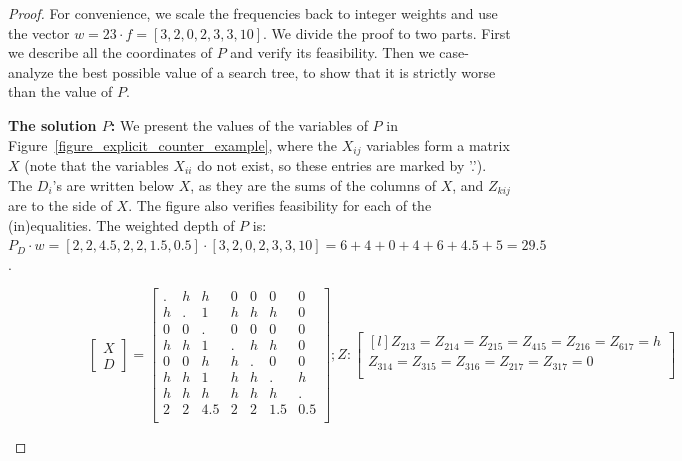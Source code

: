 \begin{proof}
For convenience, we scale the frequencies back to integer weights and use the vector $w = 23 \cdot f = [3,2,0,2,3,3,10]$.
We divide the proof to two parts. First we describe all the coordinates of $P$ and verify its feasibility. Then we case-analyze the best possible value of a search tree, to show that it is strictly worse than the value of $P$.

\textbf{The solution $P$:} We present the values of the variables of $P$ in Figure~\ref{figure_explicit_counter_example}, where the $X_{ij}$ variables form a matrix $X$ (note that the variables $X_{ii}$ do not exist, so these entries are marked by '.'). The $D_i$'s are written below $X$, as they are the sums of the columns of $X$, and $Z_{kij}$ are to the side of $X$. The figure also verifies feasibility for each of the (in)equalities. The weighted depth of $P$ is: $P_D \cdot w = [2,2,4.5,2,2,1.5,0.5] \cdot [3,2,0,2,3,3,10] = 6+4+0+4+6+4.5+5=29.5$.


\begin{figure}[ht]
    {\footnotesize
    \begin{subfigure}{0.9\textwidth}
        \begin{equation}
        \label{equation_vertex_opt_values}
        \begin{bmatrix}
            X \\
            \hline
            D
            \end{bmatrix}
        =
            \begin{bmatrix}
            . & h & h & 0 & 0 & 0 & 0 \\
            h & . & 1 & h & h & h & 0 \\
            0 & 0 & . & 0 & 0 & 0 & 0 \\
            h & h & 1 & . & h & h & 0 \\
            0 & 0 & h & h & . & 0 & 0 \\
            h & h & 1 & h & h & . & h \\
            h & h & h & h & h & h & . \\
            \hline
            2 & 2 & 4.5 & 2 & 2 & 1.5 & 0.5 \\
            \end{bmatrix}
        ; Z:
        \begin{bmatrix*}[l]
            Z_{213}=Z_{214}=Z_{215}=Z_{415}=Z_{216}=Z_{617}=h \\
            Z_{314}=Z_{315}=Z_{316}=Z_{217}=Z_{317}=0 \\
    

\end{bmatrix*}
\end{equation}
\end{subfigure}}
\end{figure}
\end{proof}
